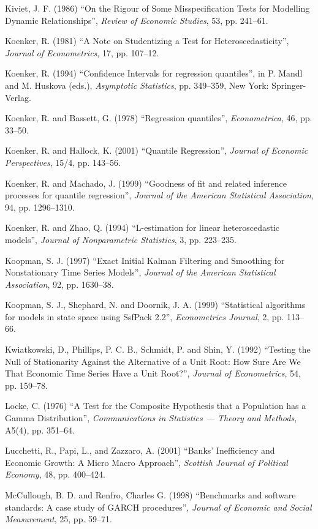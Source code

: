 \begin{thebibliography}
  Kiviet, J. F. (1986) ``On the Rigour of Some Misspecification Tests
  for Modelling Dynamic Relationships'', \emph{Review of Economic
    Studies}, 53, pp. 241--61.

  Koenker, R. (1981) ``A Note on Studentizing a Test for
  Heteroscedasticity'', \emph{Journal of Econometrics}, 17,
  pp. 107--12.

  Koenker, R. (1994) ``Confidence Intervals for regression
  quantiles'', in P. Mandl and M. Huskova (eds.), \emph{Asymptotic
    Statistics}, pp. 349--359, New York: Springer-Verlag.

  Koenker, R. and Bassett, G. (1978) ``Regression quantiles'',
  \emph{Econometrica}, 46, pp. 33--50.

  Koenker, R. and Hallock, K. (2001) ``Quantile Regression'',
  \emph{Journal of Economic Perspectives}, 15/4, pp. 143--56.

  Koenker, R. and Machado, J. (1999) ``Goodness of fit and related
  inference processes for quantile regression'', \emph{Journal of the
    American Statistical Association}, 94, pp. 1296--1310.

  Koenker, R. and Zhao, Q. (1994) ``L-estimation for linear
  heteroscedastic models'', \emph{Journal of Nonparametric
    Statistics}, 3, pp. 223--235.

  Koopman, S. J. (1997) ``Exact Initial Kalman Filtering and
  Smoothing for Nonstationary Time Series Models'', \emph{Journal of
    the American Statistical Association}, 92, pp. 1630--38.

  Koopman, S. J., Shephard, N. and Doornik, J. A. (1999) 
  ``Statistical algorithms for models in state space using SsfPack
  2.2'', \emph{Econometrics Journal}, 2, pp. 113--66.

  Kwiatkowski, D., Phillips, P. C. B., Schmidt, P. and Shin, Y. (1992)
  ``Testing the Null of Stationarity Against the Alternative of a Unit
  Root: How Sure Are We That Economic Time Series Have a Unit Root?'',
  \emph{Journal of Econometrics}, 54, pp. 159--78.

  Locke, C. (1976) ``A Test for the Composite Hypothesis that a
  Population has a Gamma Distribution'', \emph{Communications in
    Statistics --- Theory and Methods}, A5(4), pp. 351--64.
  
  Lucchetti, R., Papi, L., and Zazzaro, A. (2001) ``Banks'
  Inefficiency and Economic Growth: A Micro Macro Approach'',
  \emph{Scottish Journal of Political Economy}, 48, pp. 400--424.

  McCullough, B. D. and Renfro, Charles G. (1998) ``Benchmarks and
  software standards: A case study of GARCH procedures'',
  \emph{Journal of Economic and Social Measurement}, 25, pp. 59--71.


\end{thebibliography}
